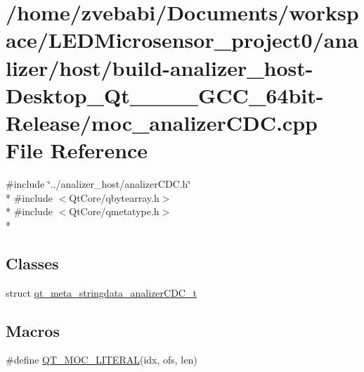 \hypertarget{build-analizer__host-_desktop___qt__5__9__0___g_c_c__64bit-_release_2moc__analizer_c_d_c_8cpp}{\section{/home/zvebabi/\+Documents/workspace/\+L\+E\+D\+Microsensor\+\_\+project0/analizer/host/build-\/analizer\+\_\+host-\/\+Desktop\+\_\+\+Qt\+\_\+\_\+\_\+\_\+\+G\+C\+C\+\_\+64bit-\/\+Release/moc\+\_\+analizer\+C\+D\+C.cpp File Reference}
\label{build-analizer__host-_desktop___qt__5__9__0___g_c_c__64bit-_release_2moc__analizer_c_d_c_8cpp}
}
{\ttfamily \#include \char`\"{}../analizer\+\_\+host/analizer\+C\+D\+C.\+h\char`\"{}}\\*
{\ttfamily \#include $<$Qt\+Core/qbytearray.\+h$>$}\\*
{\ttfamily \#include $<$Qt\+Core/qmetatype.\+h$>$}\\*
\subsection*{Classes}
\begin{DoxyCompactItemize}
\item 
struct \hyperlink{structqt__meta__stringdata__analizer_c_d_c__t}{qt\+\_\+meta\+\_\+stringdata\+\_\+analizer\+C\+D\+C\+\_\+t}
\end{DoxyCompactItemize}
\subsection*{Macros}
\begin{DoxyCompactItemize}
\item 
\#define \hyperlink{build-analizer__host-_desktop___qt__5__9__0___g_c_c__64bit-_release_2moc__analizer_c_d_c_8cpp_a75bb9482d242cde0a06c9dbdc6b83abe}{Q\+T\+\_\+\+M\+O\+C\+\_\+\+L\+I\+T\+E\+R\+A\+L}(idx, ofs, len)
\end{DoxyCompactItemize}


